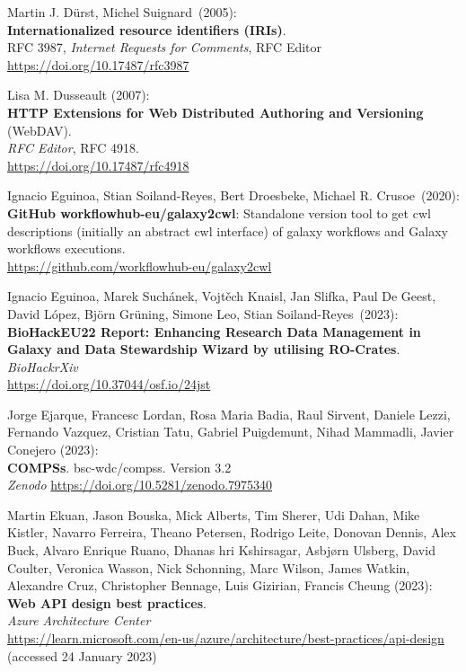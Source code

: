 \begin{thebibliography}{9}
Martin J. Dürst, Michel Suignard~(2005):\\
\textbf{Internationalized resource identifiers (IRIs)}.\\
RFC 3987, \emph{Internet Requests for Comments}, RFC Editor\\
\url{https://doi.org/10.17487/rfc3987}

Lisa M. Dusseault (2007): \\
\textbf{HTTP Extensions for Web Distributed Authoring and Versioning} (WebDAV). \\
\emph{RFC Editor}, RFC 4918.\\
\url{https://doi.org/10.17487/rfc4918}

Ignacio Eguinoa, Stian Soiland-Reyes, Bert Droesbeke, Michael
R. Crusoe~(2020):\\
\textbf{GitHub workflowhub-eu/galaxy2cwl}: Standalone version tool to
get cwl descriptions (initially an abstract cwl interface) of galaxy
workflows and Galaxy workflows executions.\\
\url{https://github.com/workflowhub-eu/galaxy2cwl}

Ignacio Eguinoa, Marek Suchánek, Vojtěch Knaisl, Jan Slifka, Paul De Geest, David López, Björn Grüning, Simone Leo, Stian Soiland-Reyes~(2023):\\
\textbf{BioHackEU22 Report: Enhancing Research Data Management in Galaxy and Data Stewardship Wizard by utilising RO-Crates}.\\
\emph{BioHackrXiv}\\
\url{https://doi.org/10.37044/osf.io/24jst}

Jorge Ejarque, Francesc Lordan, Rosa Maria Badia, Raul Sirvent, Daniele Lezzi, Fernando Vazquez, Cristian Tatu,  Gabriel Puigdemunt, Nihad Mammadli, Javier Conejero (2023):\\
\textbf{COMPSs}. bsc-wdc/compss. Version 3.2\\
\emph{Zenodo}
\url{https://doi.org/10.5281/zenodo.7975340}

Martin Ekuan, Jason Bouska, Mick Alberts, Tim Sherer, Udi Dahan, Mike Kistler, Navarro Ferreira, Theano Petersen, Rodrigo Leite, Donovan Dennis, Alex Buck, Alvaro Enrique Ruano, Dhanas
hri Kshirsagar, Asbjørn Ulsberg, David Coulter, Veronica Wasson, Nick Schonning, Marc Wilson, James Watkin, Alexandre Cruz, Christopher Bennage, Luis Gizirian, Francis Cheung (2023):\\
\textbf{Web {API} design best practices}.\\
\emph{Azure Architecture Center}\\
\url{https://learn.microsoft.com/en-us/azure/architecture/best-practices/api-design}
(accessed 24 January 2023)


\end{thebibliography}
